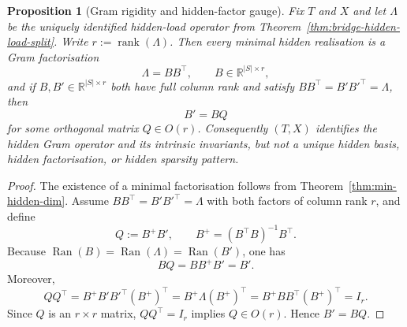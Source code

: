 \documentclass[11pt]{article}
\numberwithin{equation}{section}
\DeclareMathOperator{\rank}{rank}
\theoremstyle{thmcompact}
\newtheorem{proposition}[theorem]{Proposition}
\theoremstyle{remark}
\begin{document}
\begin{proposition}[Gram rigidity and hidden-factor gauge]\label{prop:bridge-hidden-factor-gauge}
Fix $T$ and $X$ and let $\Lambda$ be the uniquely identified hidden-load operator from Theorem~\ref{thm:bridge-hidden-load-split}. Write $r:=\rank(\Lambda)$. Then every minimal hidden realisation is a Gram factorisation
\[
\Lambda=BB^\top,
\qquad B\in\mathbb R^{|S|\times r},
\]
and if $B,B'\in\mathbb R^{|S|\times r}$ both have full column rank and satisfy $BB^\top=B'B'^\top=\Lambda$, then
\[
B'=BQ
\]
for some orthogonal matrix $Q\in O(r)$. Consequently $(T,X)$ identifies the hidden Gram operator and its intrinsic invariants, but not a unique hidden basis, hidden factorisation, or hidden sparsity pattern.
\end{proposition}

\begin{proof}
The existence of a minimal factorisation follows from Theorem~\ref{thm:min-hidden-dim}. Assume $BB^\top=B'B'^\top=\Lambda$ with both factors of column rank $r$, and define
\[
Q:=B^+B',
\qquad
B^+=(B^\top B)^{-1}B^\top.
\]
Because $\operatorname{Ran}(B)=\operatorname{Ran}(\Lambda)=\operatorname{Ran}(B')$, one has
\[
BQ=BB^+B'=B'.
\]
Moreover,
\[
QQ^\top
=B^+B'B'^\top(B^+)^\top
=B^+\Lambda(B^+)^\top
=B^+BB^\top(B^+)^\top
=I_r.
\]
Since $Q$ is an $r\times r$ matrix, $QQ^\top=I_r$ implies $Q\in O(r)$. Hence $B'=BQ$.
\end{proof}
\end{document}
